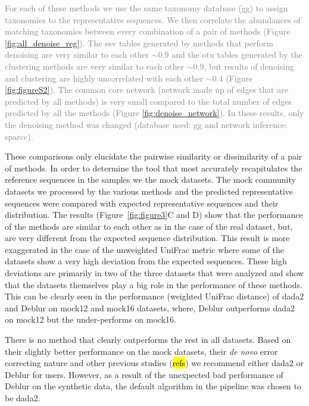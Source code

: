   \textcolor{gray}{
    For each of these methods we use the same taxonomy database (\ac{gg}) to assign taxonomies to the representative sequences.
    We then correlate the abundances of matching taxonomies between every combination of a pair of methods (Figure \ref{fig:all_denoise_reg}).
    The \ac{esv} tables generated by methods that perform denoising are very similar to each other $\sim0.9$ and the \ac{otu} tables generated by the clustering methods are very similar to each other $\sim0.9$, but results of denoising and clustering are highly uncorrelated with each other $\sim0.4$ (Figure \ref{fig:figureS2}).
    The common core network (network made up of edges that are predicted by all methods) is very small compared to the total number of edges predicted by all the methods (Figure \ref{fig:denoise_network}).
    In these results, only the denoising method was changed (database used: \ac{gg} and network inference: \ac{sparcc}).
  }

  These comparisons only elucidate the pairwise similarity or dissimilarity of a pair of methods.
  In order to determine the tool that most accurately recapitulates the reference sequences in the samples we the mock datasets.
  The mock community datasets we processed by the various methods and the predicted representative sequences were compared with expected representative sequences and their distribution.
  The results (Figure~\ref{fig:figure3}C and D) show that the performance of the methods are similar to each other as in the case of the real dataset, but, are very different from the expected sequence distribution.
  This result is more exaggerated in the case of the unweighted UniFrac metric where some of the datasets show a very high deviation from the expected sequences.
  These high deviations are primarily in two of the three datasets that were analyzed and show that the datasets themselves play a big role in the performance of these methods.
  This can be clearly seen in the performance (weighted UniFrac distance) of \ac{dada2} and Deblur on mock12 and mock16 datasets, where, Deblur outperforms \ac{dada2} on mock12 but the under-performs on mock16.

  There is no method that clearly outperforms the rest in all datasets.
  Based on their slightly better performance on the mock datasets, their \textit{de novo} error correcting nature and other previous studies (\hl{refs}) we recommend either \ac{dada2} or Deblur for users.
  However, as a result of the unexpected bad performance of Deblur on the synthetic data, the default algorithm in the pipeline was chosen to be \ac{dada2}.

